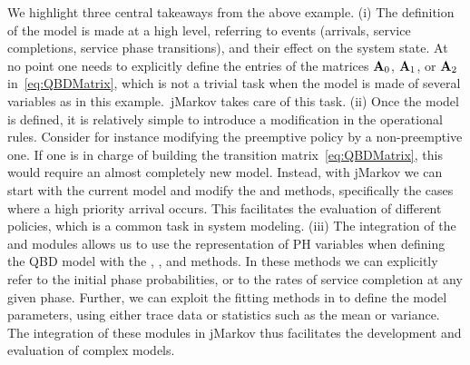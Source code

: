 We highlight three central takeaways from the above example. (i) The definition
of the model is made at a high level, referring to events (arrivals, service
completions, service phase transitions), and their effect on the system state.
At no point one needs to explicitly define the entries of the matrices $\bA_0$,
$\bA_1$, or $\bA_2$ in~\eqref{eq:QBDMatrix}, which is not a trivial task when
the model is made of several variables as in this example.\ jMarkov takes care
of this task. (ii) Once the model is defined, it is relatively simple to
introduce a modification in the operational rules. Consider for instance
modifying the preemptive policy by a non-preemptive one. If one is in charge of
building the transition matrix~\eqref{eq:QBDMatrix}, this would require an
almost completely new model. Instead, with jMarkov we can start with the
current model and modify the \Dests and \Rate methods, specifically the cases
where a high priority arrival occurs. This facilitates the evaluation of
different policies, which is a common task in system modeling. (iii) The
integration of the \jQBD and \jPhase modules allows us to use the
representation of PH variables when defining the QBD model with the \Active,
\Dests, and \Rate methods. In these methods we can explicitly refer to the
initial phase probabilities, or to the rates of service completion at any given
phase. Further, we can exploit the fitting methods in \jPhase to define the
model parameters, using either trace data or statistics such as the mean or
variance. The integration of these modules in jMarkov thus facilitates the
development and evaluation of complex models.

